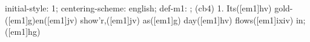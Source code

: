 initial-style: 1;
centering-scheme: english;
def-m1: \grealign;
(cb4) 1. Its([em1]hv) gold-([em1]g)en([em1]jv) show'r,([em1]jv) as([em1]g) day([em1]hv) flows([em1]ixiv) in;([em1]hg)